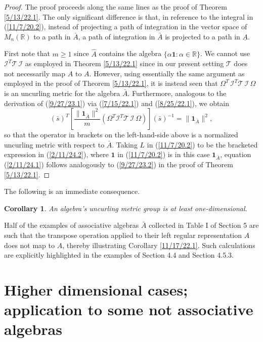 \documentclass{amsart}
\numberwithin{equation}{section}
\newtheorem{corollary}[theorem]{Corollary}
\theoremstyle{definition}
\numberwithin{theorem}{section}
\begin{document}
 \begin{proof} The proof proceeds along the same lines as the proof of Theorem \ref{5/13/22.1}.  The only significant difference is that, in reference to the integral in (\ref{11/7/20.2}), instead of projecting a path of integration in the vector space of $M_n(\mathbb{R})$ to a path in $\bar{A}$, a path of integration in $\bar{A}$ is projected to a path in $\underline{A}$.
 
First note that $m\ge 1$ since $\hat{A}$ contains the algebra $\{\alpha\mathbf{1}:\alpha\in\mathbb{R}\}$.  We cannot use $\mathcal{I}^T\mathcal{T}\,\mathcal{I}$  as employed in Theorem \ref{5/13/22.1} since in our present setting $\mathcal{T}$ does not necessarily map $A$ to $A$. However, using essentially the same argument as employed in the proof of Theorem \ref{5/13/22.1}, it is instead seen that $\Omega^T\,\mathcal{I}^T\mathcal{T}\,\mathcal{I}\,\Omega$ is an uncurling metric for the algebra $\bar{A}$.  Furthermore, analogous to the derivation of (\ref{9/27/23.1}) via (\ref{7/15/22.1}) and (\ref{8/25/22.1}), we obtain
 \begin{equation}\label{2/11/24.2}
 (\bar{s})^T \left[ \frac{\|\mathbf{1}_{\bar{A}}\|^2}{m} (\Omega^T\mathcal{I}^T\mathcal{T}\,\mathcal{I}\,\Omega)\right](\bar{s})^{-1}
  = \|\mathbf{1}_{\bar{A}}\|^2,\end{equation} so that the operator in brackets on the left-hand-side above is a normalized uncurling metric with respect to $\bar{A}$.  Taking $L$ in (\ref{11/7/20.2}) to be the bracketed expression in (\ref{2/11/24.2}), where $\mathbf{1}$ in (\ref{11/7/20.2}) is in this case $\mathbf{1}_{\bar{A}}$, equation (\ref{2/11/24.1}) follows analogously to (\ref{9/27/23.2}) in the proof of Theorem \ref{5/13/22.1}.
 \end{proof}
 
 The following is an immediate consequence.
 
 \begin{corollary}\label{1/1/23.1} An algebra's uncurling metric group is at least one-dimensional. \end{corollary}
  
Half of the examples of associative algebras $\bar{A}$ collected in Table I of Section 5 are such that the transpose operation applied to their left regular representation $A$ does not map to $A$, thereby illustrating Corollary \ref{11/17/22.1}.  Such calculations are explicitly highlighted in the examples of Section 4.4 and Section 4.5.3.

\section{Higher dimensional cases; application to some not associative algebras}
\end{document}
